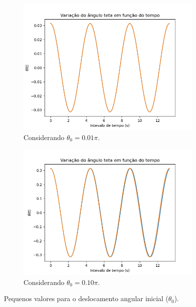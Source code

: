 \documentclass[12pt,openright,twoside,english,brazil]{abntex2}
\begin{document}
\begin{figure}[h]
 \centering
 \begin{subfigure}{.5\textwidth}
  \centering
  \includegraphics[width=1.1\linewidth]{teta-0-01pi.png}
  \caption{Considerando $\theta_0=0.01\pi$.}
 \end{subfigure}%
 \begin{subfigure}{.5\textwidth}
  \centering
  \includegraphics[width=1.1\linewidth]{teta-0-10pi.png}
  \caption{Considerando $\theta_0=0.10\pi$.}
 \end{subfigure}
 \caption{Pequenos valores para o deslocamento angular inicial ($\theta_0$).}
 \label{Figura5}
\end{figure}
\end{document}
